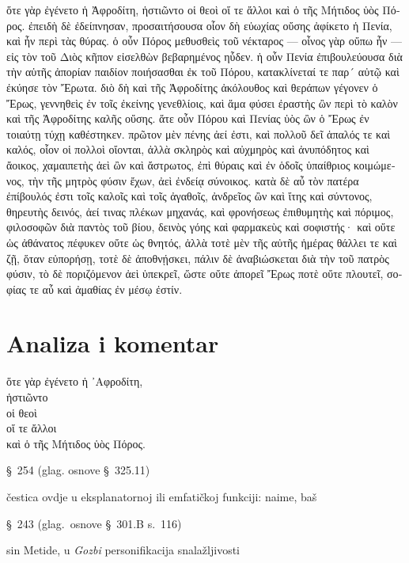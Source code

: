 {\large

\begin{greek}

\noindent ὅτε γὰρ ἐγένετο ἡ Ἀφροδίτη, ἡστιῶντο οἱ θεοὶ οἵ τε ἄλλοι καὶ ὁ τῆς Μήτιδος ὑὸς Πόρος. ἐπειδὴ δὲ ἐδείπνησαν, προσαιτήσουσα οἷον δὴ εὐωχίας οὔσης ἀφίκετο ἡ Πενία, καὶ ἦν περὶ τὰς θύρας. ὁ οὖν Πόρος μεθυσθεὶς τοῦ νέκταρος — οἶνος γὰρ οὔπω ἦν — εἰς τὸν τοῦ Διὸς κῆπον εἰσελθὼν βεβαρημένος ηὗδεν. ἡ οὖν Πενία ἐπιβουλεύουσα διὰ τὴν αὑτῆς ἀπορίαν παιδίον ποιήσασθαι ἐκ τοῦ Πόρου, κατακλίνεταί τε παρ´ αὐτῷ καὶ ἐκύησε τὸν Ἔρωτα. διὸ δὴ καὶ τῆς Ἀφροδίτης ἀκόλουθος καὶ θεράπων γέγονεν ὁ Ἔρως, γεννηθεὶς ἐν τοῖς ἐκείνης γενεθλίοις, καὶ ἅμα φύσει ἐραστὴς ὢν περὶ τὸ καλὸν καὶ τῆς Ἀφροδίτης καλῆς οὔσης. ἅτε οὖν Πόρου καὶ Πενίας ὑὸς ὢν ὁ Ἔρως ἐν τοιαύτῃ τύχῃ καθέστηκεν. πρῶτον μὲν πένης ἀεί ἐστι, καὶ πολλοῦ δεῖ ἁπαλός τε καὶ καλός, οἷον οἱ πολλοὶ οἴονται, ἀλλὰ σκληρὸς καὶ αὐχμηρὸς καὶ ἀνυπόδητος καὶ ἄοικος, χαμαιπετὴς ἀεὶ ὢν καὶ ἄστρωτος, ἐπὶ θύραις καὶ ἐν ὁδοῖς ὑπαίθριος κοιμώμενος, τὴν τῆς μητρὸς φύσιν ἔχων, ἀεὶ ἐνδείᾳ σύνοικος. κατὰ δὲ αὖ τὸν πατέρα ἐπίβουλός ἐστι τοῖς καλοῖς καὶ τοῖς ἀγαθοῖς, ἀνδρεῖος ὢν καὶ ἴτης καὶ σύντονος, θηρευτὴς δεινός, ἀεί τινας πλέκων μηχανάς, καὶ φρονήσεως ἐπιθυμητὴς καὶ πόριμος, φιλοσοφῶν διὰ παντὸς τοῦ βίου, δεινὸς γόης καὶ φαρμακεὺς καὶ σοφιστής· καὶ οὔτε ὡς ἀθάνατος πέφυκεν οὔτε ὡς θνητός, ἀλλὰ τοτὲ μὲν τῆς αὐτῆς ἡμέρας θάλλει τε καὶ ζῇ, ὅταν εὐπορήσῃ, τοτὲ δὲ ἀποθνῄσκει, πάλιν δὲ ἀναβιώσκεται διὰ τὴν τοῦ πατρὸς φύσιν, τὸ δὲ ποριζόμενον ἀεὶ ὑπεκρεῖ, ὥστε οὔτε ἀπορεῖ Ἔρως ποτὲ οὔτε πλουτεῖ, σοφίας τε αὖ καὶ ἀμαθίας ἐν μέσῳ ἐστίν.

\end{greek}

}


\section*{Analiza i komentar}


{\large
\begin{greek}
\noindent ὅτε γὰρ ἐγένετο ἡ ᾿Αφροδίτη, \\
ἡστιῶντο \\
οἱ θεοὶ \\
οἵ τε ἄλλοι \\
καὶ ὁ τῆς Μήτιδος ὑὸς Πόρος.\\

\end{greek}
}

\begin{description}[noitemsep]
\item[ἐγένετο] §~254 (glag. osnove §~325.11)
\item[γὰρ] čestica ovdje u eksplanatornoj ili emfatičkoj funkciji: naime, baš
\item[ἡστιῶντο] §~243 (glag.\ osnove §~301.B s.~116)
\item[Πόρος] sin Metide, u \textit{Gozbi} personifikacija snalažljivosti

\end{description}

